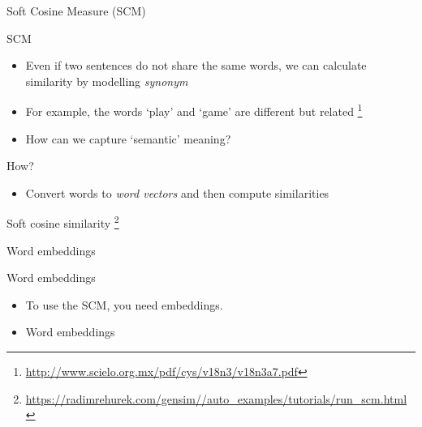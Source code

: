 \documentclass[handout]{beamer}
\begin{document}
\begin{frame}{Soft Cosine Measure (SCM)}
	\begin{block}{SCM}
		\begin{itemize}
			\item <1-> Even if two sentences do not share the same words, we can calculate similarity by modelling \emph{synonym}
			\item <2->For example, the words `play' and `game' are different but related \footnote{\url{http://www.scielo.org.mx/pdf/cys/v18n3/v18n3a7.pdf}}
			\item<3->How can we capture `semantic' meaning?
		\end{itemize}
	\end{block}
	\begin{exampleblock}{How?}
		\begin{itemize}
			\item <4-> Convert words to \emph{word vectors} and then compute similarities 
		\end{itemize}
	\end{exampleblock}
\end{frame}

\begin{frame}
	Soft cosine similarity \footnote{\url{https://radimrehurek.com/gensim//auto_examples/tutorials/run_scm.html}}
\end{frame}

\begin{frame}{Word embeddings}
	\begin{block}{Word embeddings}
		\begin{itemize}
			\item <1->To use the SCM, you need embeddings. 
			\item <2->Word embeddings
		\end{itemize}
	\end{block}
\end{frame}
\end{document}
